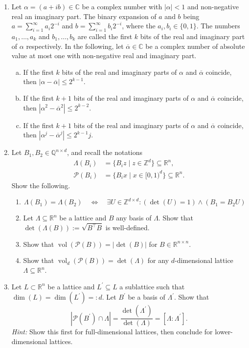 \documentclass[12pt,a4paper]{article}
\newcommand{\br}[1]{\overline{#1}}
\def \R {\mathbb R}
\def \Q {\mathbb Q}
\def \Z {\mathbb Z}
\DeclareMathOperator{\vol}{vol}
\begin{document}
\begin{enumerate}
\item Let $α = (a + ib)∈ℂ$ be a complex number with $|α|<1$ and non-negative real an imaginary part. The binary expansion of $a$ and $b$ being $a = ∑_{i=1}^∞ a_i 2^{-i}$ and  $b = ∑_{i=1}^∞ b_i 2^{-i}$, where the $a_i, b_i ∈ \{0,1\}$. The numbers $a_1,\dots,a_k$ and $b_1,\dots,b_k$ are called the first $k$ bits of the real and imaginary part of $α$ respectively. In the following, let $\br{α} ∈ℂ$ be a complex number of absolute value at most one with non-negative real and imaginary part.  
  \begin{enumerate}[a)]
  \item If the first $k$ bits of the real and imaginary parts of $α$ and $\br{α}$ coincide, then $|α - \br{α}| ≤2^{k-1}$.
  \item If the first $k+1$ bits of the real and imaginary parts of $α$ and $\br{α}$ coincide, then $|α^2 - \br{α}^2| ≤2^{k-2}$.
  \item If the first $k+1$ bits of the real and imaginary parts of $α$ and $\br{α}$ coincide, then $|α^j - \br{α}^j| ≤2^{k-1} j$.
  \end{enumerate}

\item Let $B_1, B_2 \in \Q^{n \times d}$, and recall the notations
\begin{align*}
\Lambda(B_i) &= \{ B_i z \mid z \in \Z^d\} \subseteq \R^n, \\
\mathcal{P}(B_i) &= \{B_i x \mid x \in [0,1)^d\} \subseteq \R^n.
\end{align*}
Show the following.
\begin{enumerate}
\item
\[
\Lambda (B_1) = \Lambda (B_2) \quad \Leftrightarrow \quad \exists U \in \Z^{d \times d}: (\det(U) = 1) \wedge (B_1 = B_2 U)
\]
\item Let $\Lambda \subseteq \R^n$ be a lattice and $B$ any basis of $\Lambda$.
Show that $\det (\Lambda(B)) := \sqrt{B^\intercal B}$ is well-defined.
\item Show that $\vol(\mathcal{P}(B)) = | \det (B) |$ for $B \in \R^{n \times n}$.
\item Show that $\vol_d(\mathcal{P}(B)) = \det (\Lambda)$ for any $d$-dimensional lattice $\Lambda \subseteq \R^n$.
\end{enumerate}
\item Let $L \subset \R^n$ be a lattice and $L^\prime \subseteq L$ a sublattice such that $\dim(L) = \dim(L^\prime) =: d$.
Let $B^\prime$ be a basis of $\Lambda^\prime$.
Show that
\[
 | \mathcal{P}(B^\prime) \cap \Lambda | = \frac{\det(\Lambda^\prime)}{\det (\Lambda)} = [\Lambda : \Lambda^\prime].
\]
\textit{Hint:} Show this first for full-dimensional lattices, then conclude for lower-dimensional lattices.
\end{enumerate}
\end{document}
